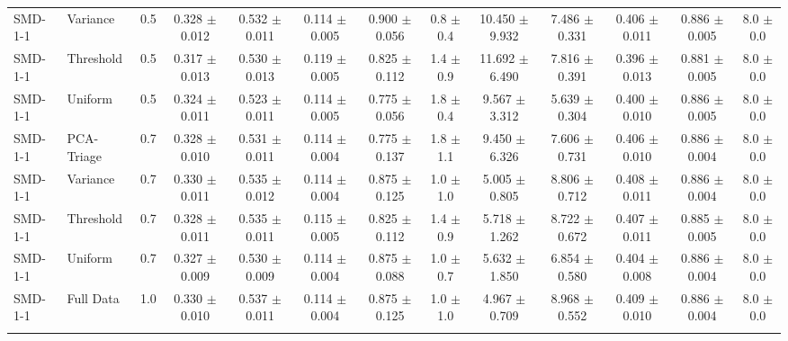 \begin{table}[p]
{\begin{tabular}{@{}llccccccccccc@{}}
SMD-1-1 & Variance & 0.5 & 0.328 $\pm$ 0.012 & 0.532 $\pm$ 0.011 & 0.114 $\pm$ 0.005 & 0.900 $\pm$ 0.056 & 0.8 $\pm$ 0.4 & 10.450 $\pm$ 9.932 & 7.486 $\pm$ 0.331 & 0.406 $\pm$ 0.011 & 0.886 $\pm$ 0.005 & 8.0 $\pm$ 0.0 \\
SMD-1-1 & Threshold & 0.5 & 0.317 $\pm$ 0.013 & 0.530 $\pm$ 0.013 & 0.119 $\pm$ 0.005 & 0.825 $\pm$ 0.112 & 1.4 $\pm$ 0.9 & 11.692 $\pm$ 6.490 & 7.816 $\pm$ 0.391 & 0.396 $\pm$ 0.013 & 0.881 $\pm$ 0.005 & 8.0 $\pm$ 0.0 \\
SMD-1-1 & Uniform & 0.5 & 0.324 $\pm$ 0.011 & 0.523 $\pm$ 0.011 & 0.114 $\pm$ 0.005 & 0.775 $\pm$ 0.056 & 1.8 $\pm$ 0.4 & 9.567 $\pm$ 3.312 & 5.639 $\pm$ 0.304 & 0.400 $\pm$ 0.010 & 0.886 $\pm$ 0.005 & 8.0 $\pm$ 0.0 \\
SMD-1-1 & PCA-Triage & 0.7 & 0.328 $\pm$ 0.010 & 0.531 $\pm$ 0.011 & 0.114 $\pm$ 0.004 & 0.775 $\pm$ 0.137 & 1.8 $\pm$ 1.1 & 9.450 $\pm$ 6.326 & 7.606 $\pm$ 0.731 & 0.406 $\pm$ 0.010 & 0.886 $\pm$ 0.004 & 8.0 $\pm$ 0.0 \\
SMD-1-1 & Variance & 0.7 & 0.330 $\pm$ 0.011 & 0.535 $\pm$ 0.012 & 0.114 $\pm$ 0.004 & 0.875 $\pm$ 0.125 & 1.0 $\pm$ 1.0 & 5.005 $\pm$ 0.805 & 8.806 $\pm$ 0.712 & 0.408 $\pm$ 0.011 & 0.886 $\pm$ 0.004 & 8.0 $\pm$ 0.0 \\
SMD-1-1 & Threshold & 0.7 & 0.328 $\pm$ 0.011 & 0.535 $\pm$ 0.011 & 0.115 $\pm$ 0.005 & 0.825 $\pm$ 0.112 & 1.4 $\pm$ 0.9 & 5.718 $\pm$ 1.262 & 8.722 $\pm$ 0.672 & 0.407 $\pm$ 0.011 & 0.885 $\pm$ 0.005 & 8.0 $\pm$ 0.0 \\
SMD-1-1 & Uniform & 0.7 & 0.327 $\pm$ 0.009 & 0.530 $\pm$ 0.009 & 0.114 $\pm$ 0.004 & 0.875 $\pm$ 0.088 & 1.0 $\pm$ 0.7 & 5.632 $\pm$ 1.850 & 6.854 $\pm$ 0.580 & 0.404 $\pm$ 0.008 & 0.886 $\pm$ 0.004 & 8.0 $\pm$ 0.0 \\
SMD-1-1 & Full Data & 1.0 & 0.330 $\pm$ 0.010 & 0.537 $\pm$ 0.011 & 0.114 $\pm$ 0.004 & 0.875 $\pm$ 0.125 & 1.0 $\pm$ 1.0 & 4.967 $\pm$ 0.709 & 8.968 $\pm$ 0.552 & 0.409 $\pm$ 0.010 & 0.886 $\pm$ 0.004 & 8.0 $\pm$ 0.0 \\
\addlinespace
\bottomrule
\end{tabular}%
}
\label{supp-det-smd-fixed_full_data}
\end{table}
